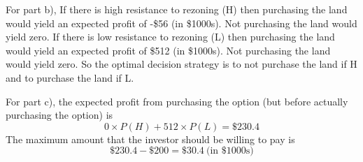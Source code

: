 \begin{enumerate}
\begin{solution}
For part b), If there is high resistance to rezoning (H) then
purchasing the land would yield an expected profit of -\$56 (in \$1000s).
Not purchasing the land would yield zero. If there is low
resistance to rezoning (L) then purchasing the land would yield
an expected profit of \$512 (in \$1000s). Not purchasing the
land would yield zero. So the optimal decision strategy is to
not purchase the land if H and to purchase the land if L.

For part c), the expected profit from purchasing the option
(but before actually purchasing the option) is
\[ 0 \times P(H) + 512 \times P(L) = \$230.4 \]
The maximum amount that the investor should be willing to pay is
\[ \$230.4 - \$200 = \$30.4 ~\text{(in \$1000s)} \]
\end{solution}

\end{enumerate}
